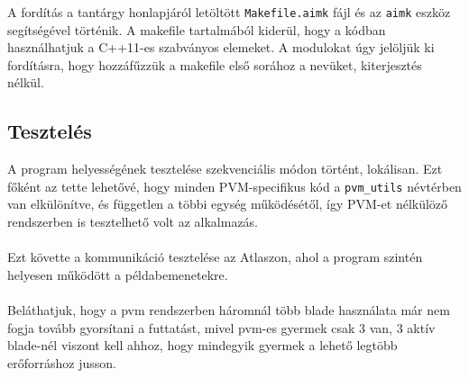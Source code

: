 \documentclass[12pt]{article}
\begin{document}
A fordítás a tantárgy honlapjáról letöltött \verb|Makefile.aimk| fájl és az \verb|aimk| eszköz
segítségével történik. A makefile tartalmából kiderül, hogy a kódban használhatjuk a C++11-es
szabványos elemeket.
A modulokat úgy jelöljük ki fordításra, hogy hozzáfűzzük a makefile első sorához a nevüket,
kiterjesztés nélkül.

\subsection{Tesztelés}

A program helyességének tesztelése szekvenciális módon történt, lokálisan. Ezt főként az tette lehetővé, hogy minden PVM-specifikus kód a \verb|pvm_utils| névtérben van elkülönítve, és független a többi egység működésétől, így PVM-et nélkülöző rendszerben is tesztelhető volt az alkalmazás. \\
\\
Ezt követte a kommunikáció tesztelése az Atlaszon, ahol a program szintén helyesen működött a példabemenetekre. \\
\\
Beláthatjuk, hogy a pvm rendszerben háromnál több blade használata már nem fogja tovább gyorsítani a futtatást, mivel pvm-es gyermek csak 3 van, 3 aktív blade-nél viszont kell ahhoz, hogy mindegyik gyermek a lehető legtöbb erőforráshoz jusson. 
\end{document}
